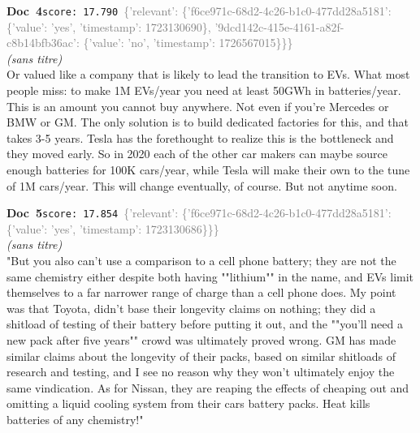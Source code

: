\documentclass[a4paper,11pt]{article}
\begin{document}
\begin{docenv}
{\footnotesize\textcolor{doccolor}{\textbf{Doc~4}}}\hfill{\tiny\texttt{score:~17.790}}\ {\tiny\textcolor{gray}{\{'relevant': \{'f6ce971c-68d2-4c26-b1c0-477dd28a5181': \{'value': 'yes', 'timestamp': 1723130690\}, '9dcd142c-415e-4161-a82f-c8b14bfb36ac': \{'value': 'no', 'timestamp': 1726567015\}\}\}}}\\[3pt]
{\small\textit{(sans titre)}}\\[2pt]
\vspace{2pt}
{\footnotesize 
Or valued like a company that is likely to lead the transition to EVs.  What most people miss: to make 1M EVs/year you need at least 50GWh in batteries/year. This is an amount you cannot buy anywhere. Not even if you're Mercedes or BMW or GM. The only solution is to build dedicated factories for this, and that takes 3-5 years.  Tesla has the forethought to realize this is the bottleneck and they moved early. So in 2020 each of the other car makers can maybe source enough batteries for 100K cars/year, while Tesla will make their own to the tune of 1M cars/year.  This will change eventually, of course. But not anytime soon.}
\end{docenv}
\begin{docenv}
{\footnotesize\textcolor{doccolor}{\textbf{Doc~5}}}\hfill{\tiny\texttt{score:~17.854}}\ {\tiny\textcolor{gray}{\{'relevant': \{'f6ce971c-68d2-4c26-b1c0-477dd28a5181': \{'value': 'yes', 'timestamp': 1723130686\}\}\}}}\\[3pt]
{\small\textit{(sans titre)}}\\[2pt]
\vspace{2pt}
{\footnotesize 
"But you also can't use a comparison to a cell phone battery; they are not the same chemistry either despite both having ""lithium"" in the name, and EVs limit themselves to a far narrower range of charge than a cell phone does.  My point was that Toyota, didn't base their longevity claims on nothing; they did a shitload of testing of their battery before putting it out, and the ""you'll need a new pack after five years"" crowd was ultimately proved wrong.  GM has made similar claims about the longevity of their packs, based on similar shitloads of research and testing, and I see no reason why they won't ultimately enjoy the same vindication.  As for Nissan, they are reaping the effects of cheaping out and omitting a liquid cooling system from their cars battery packs. Heat kills batteries of any chemistry!"}
\end{docenv}
\end{document}
